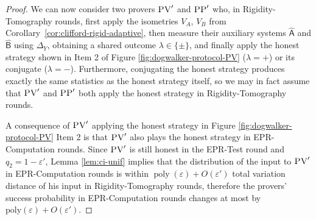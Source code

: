 \documentclass[11pt,letter]{article}
\theoremstyle{remark}
\theoremstyle{definition}
\newcommand{\ket}[1]{|#1\rangle}
\newcommand{\bra}[1]{\langle#1|}
\newcommand{\Tr}{\mbox{\rm Tr}}
\newcommand{\Es}[1]{\ensuremath{\mathop{\textsc{E}}}_{#1}}
\DeclareMathOperator{\poly}{poly}
\newcommand{\reg}[1]{{\textsf{#1}}}
\newcommand{\eps}{\varepsilon}
\newcommand{\ver}{\textsc{V}}
\newcommand{\pv}{\textsc{PV}}
\newcommand{\pp}{\textsc{PP}}
\begin{document}
\begin{proof}
We can now consider two provers $\pv'$ and $\pp'$ who, in Rigidity-Tomography rounds, first apply the isometries $V_A$, $V_B$ from Corollary~\ref{cor:clifford-rigid-adaptive}, then  measure their auxiliary systems $\hat{\reg{A}}$ and $\hat{\reg{B}}$ using $\Delta_Y$, obtaining a shared outcome $\lambda\in\{\pm\}$, and finally apply the honest strategy shown in Item 2 of Figure \ref{fig:dogwalker-protocol-PV} ($\lambda=+$) or its conjugate ($\lambda = -$). Furthermore, conjugating the honest strategy produces exactly the same statistics as the honest strategy itself, so we may in fact assume that $\pv'$ and $\pp'$ both apply the honest strategy in Rigidity-Tomography rounds. 


A consequence of $\pv'$ applying the honest strategy in Figure \ref{fig:dogwalker-protocol-PV} Item 2 is that $\pv'$ also plays the honest strategy in EPR-Computation rounds. Since $\pv'$ is still honest in the EPR-Test round and $q_2 = 1-\eps'$, Lemma \ref{lem:ci-unif} implies that the distribution of the input to $\pv'$ in EPR-Computation rounds is within $\poly(\eps)+O(\eps')$ total variation distance of his input in
Rigidity-Tomography rounds, therefore the provers' success probability in EPR-Computation rounds changes at most by $\mathrm{poly}(\eps)+O(\eps')$. 
\end{proof}
\end{document}
